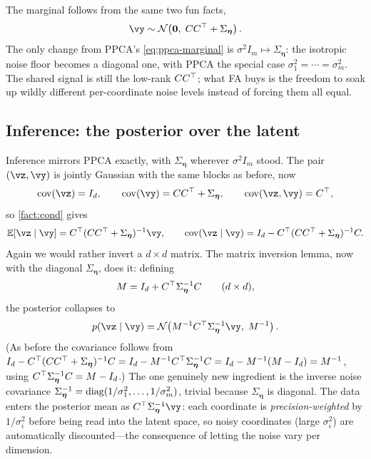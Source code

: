 \documentclass[11pt]{article}
\theoremstyle{plain}
\theoremstyle{definition}
\theoremstyle{remark}
\theoremstyle{definition}
\newcommand{\E}{\mathbb{E}}
\newcommand{\veta}{\bm{\eta}}
\newcommand{\Normal}{\mathcal{N}}
\begin{document}
The marginal follows from the same two fun facts,
\begin{equation}\label{eq:fa-marginal}
    \vy \sim \Normal\!\left(\mathbf 0,\; C C\trp + \Sigma_{\veta}\right).
\end{equation}
The only change from PPCA's \eqref{eq:ppca-marginal} is $\sigma^2 I_m \mapsto
\Sigma_{\veta}$: the isotropic noise floor becomes a diagonal one, with PPCA the
special case $\sigma_1^2 = \cdots = \sigma_m^2$. The shared signal is still the
low-rank $C C{^\top}$; what FA buys is the freedom to soak up wildly different
per-coordinate noise levels instead of forcing them all equal.

\subsection{Inference: the posterior over the latent}

Inference mirrors PPCA exactly, with $\Sigma_{\veta}$ wherever $\sigma^2 I_m$
stood. The pair $(\vz, \vy)$ is jointly Gaussian with the same blocks as before,
now
\begin{equation}
    \cov(\vz) = I_d, \qquad
    \cov(\vy) = C C\trp + \Sigma_{\veta}, \qquad
    \cov(\vz, \vy) = C\trp,
\end{equation}
so \cref{fact:cond} gives
\begin{equation}
    \E[\vz \mid \vy] = C\trp(C C\trp + \Sigma_{\veta})^{-1}\vy, \qquad
    \cov(\vz \mid \vy) = I_d - C\trp(C C\trp + \Sigma_{\veta})^{-1} C.
\end{equation}
Again we would rather invert a $d \times d$ matrix. The matrix inversion lemma,
now with the diagonal $\Sigma_{\veta}$, does it: defining
\begin{equation}\label{eq:fa-M}
    M = I_d + C\trp \Sigma_{\veta}^{-1} C \qquad (d \times d),
\end{equation}
the posterior collapses to
\begin{equation}\label{eq:fa-posterior}
    p(\vz \mid \vy) = \Normal\!\left(M^{-1} C\trp \Sigma_{\veta}^{-1}\vy,\; M^{-1}\right).
\end{equation}
(As before the covariance follows from
$I_d - C\trp(CC\trp+\Sigma_{\veta})^{-1}C = I_d - M^{-1}C\trp\Sigma_{\veta}^{-1}C
= I_d - M^{-1}(M - I_d) = M^{-1}$, using $C\trp\Sigma_{\veta}^{-1}C = M - I_d$.)
The one genuinely new ingredient is the inverse noise covariance
$\Sigma_{\veta}^{-1} = \diag(1/\sigma_1^2, \dots, 1/\sigma_m^2)$, trivial because
$\Sigma_{\veta}$ is diagonal. The data enters the posterior mean as
$C\trp \Sigma_{\veta}^{-1}\vy$: each coordinate is \emph{precision-weighted} by
$1/\sigma_i^2$ before being read into the latent space, so noisy coordinates
(large $\sigma_i^2$) are automatically discounted---the consequence of letting the
noise vary per dimension.
\end{document}

